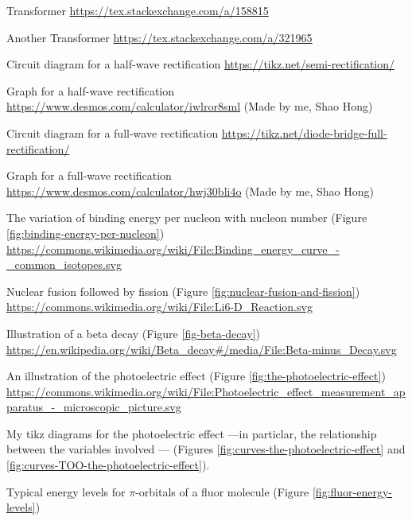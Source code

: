 \begin{enumerate}[label={[\arabic*]}]
    \item\label{Transformer} Transformer \url{https://tex.stackexchange.com/a/158815}
    \item\label{Another Transformer} Another Transformer \url{https://tex.stackexchange.com/a/321965}
    \item\label{Half-Wave-Recification-Circuit} Circuit diagram for a half-wave rectification \url{https://tikz.net/semi-rectification/}
    \item\label{Half-Wave-Recification-Graph} Graph for a half-wave rectification \url{https://www.desmos.com/calculator/iwlror8sml} (Made by me, Shao Hong)
    \item\label{Full-Wave-Rectificaion-Circuit} Circuit diagram for a full-wave rectification \url{https://tikz.net/diode-bridge-full-rectification/}
    \item\label{Full-Wave-Rectification-Graph} Graph for a full-wave rectification \url{https://www.desmos.com/calculator/hwj30bli4o} (Made by me, Shao Hong)
    \item\label{source:binding-energy-per-nucleon} The variation of binding energy per nucleon with nucleon number (Figure \ref{fig:binding-energy-per-nucleon}) \url{https://commons.wikimedia.org/wiki/File:Binding_energy_curve_-_common_isotopes.svg}
    \item\label{source:nuclear-fusion-and-fission} 
    Nuclear fusion followed by fission
    (Figure \ref{fig:nuclear-fusion-and-fission}) \url{https://commons.wikimedia.org/wiki/File:Li6-D_Reaction.svg} 
    \item\label{source:beta-decay} Illustration of a beta decay (Figure \ref{fig-beta-decay}) \url{https://en.wikipedia.org/wiki/Beta_decay#/media/File:Beta-minus_Decay.svg}
    \item\label{source:the-photoelectric-effect} An illustration of the photoelectric effect (Figure \ref{fig:the-photoelectric-effect}) \url{https://commons.wikimedia.org/wiki/File:Photoelectric_effect_measurement_apparatus_-_microscopic_picture.svg}
    \item\label{source:curves-the-photoelectric-effect} My tikz diagrams for the photoelectric effect ---in particlar, the relationship between the variables involved --- (Figures \ref{fig:curves-the-photoelectric-effect} and \ref{fig:curves-TOO-the-photoelectric-effect}).
    \item\label{source:fluor-energy-levels} Typical energy levels for \(\pi\)-orbitals of a fluor molecule (Figure \ref{fig:fluor-energy-levels}) 
    

\end{enumerate}
